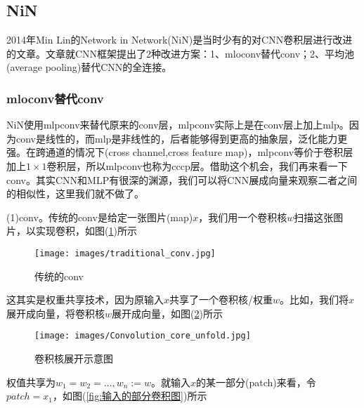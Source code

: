 
    \subsection{NiN}
        \par
        2014年Min Lin的Network in Network(NiN)\cite{2014.MinLin}是当时少有的对CNN卷积层进行改进的文章。文章就CNN框架提出了2种改进方案：1、mloconv替代conv；2、平均池(average pooling)替代CNN的全连接。
        \subsubsection{mloconv替代conv}
            \par
            NiN使用mlpconv来替代原来的conv层，mlpconv实际上是在conv层上加上mlp。因为conv是线性的，而mlp是非线性的，后者能够得到更高的抽象层，泛化能力更强。在跨通道的情况下(cross channel,cross feature map)，mlpconv等价于卷积层加上$1\times 1$卷积层，所以mlpconv也称为cccp层。借助这个机会，我们再来看一下conv。其实CNN和MLP有很深的渊源，我们可以将CNN展成向量来观察二者之间的相似性，这里我们就不做了。
            \par
            (1)conv。传统的conv是给定一张图片(map)$x$，我们用一个卷积核$w$扫描这张图片，以实现卷积，如图(\ref{fig:传统的conv})所示
            \begin{figure}[H]
            \centering
            \texttt{[image: images/traditional\_conv.jpg]}
            \caption{传统的conv}
            \label{fig:传统的conv}
            \end{figure}
            这其实是权重共享技术，因为原输入$x$共享了一个卷积核/权重$w$。比如，我们将$x$展开成向量，将卷积核$w$展开成向量，如图(\ref{fig:卷积核展开示意图})所示
            \begin{figure}[H]
            \centering
            \texttt{[image: images/Convolution\_core\_unfold.jpg]}
            \caption{卷积核展开示意图}
            \label{fig:卷积核展开示意图}
            \end{figure}
            权值共享为$w_1=w_2=\dots,w_n:=w$。就输入$x$的某一部分(patch)来看，令$patch = x_1$，如图(\ref{fig:输入的部分卷积图})所示

